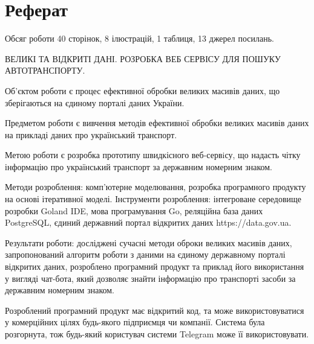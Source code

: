 \chapter*{Реферат}
Обсяг роботи 40 сторінок, 8 ілюстрацій, 1 таблиця, 13 джерел посилань.

ВЕЛИКІ ТА ВІДКРИТІ ДАНІ. РОЗРОБКА ВЕБ СЕРВІСУ ДЛЯ ПОШУКУ АВТОТРАНСПОРТУ.

Об'єктом роботи є процес ефективної обробки великих масивів даних,
що зберігаються на єдиному порталі даних України.

Предметом роботи є вивчення методів ефективної обробки
великих масивів даних на прикладі даних про український транспорт.

Метою роботи є розробка прототипу швидкісного веб-сервiсу,
що надасть чітку інформацію про український транспорт за
державним номерним знаком.

Методи розроблення: комп'ютерне моделювання, розробка програмного продукту на основі ітеративної
моделі.
Інструменти розроблення: інтегроване середовище розробки Goland IDE,
мова програмування Go, реляційна  база даних PostgreSQL, єдиний державний портал відкритих даних https://data.gov.ua.

Результати роботи: досліджені сучасні методи оброки великих масивів даних,
запропонований алгоритм роботи з даними на єдиному державному порталі відкритих даних,
розроблено програмний продукт та приклад його використання у вигляді чат-бота,
який дозволяє знайти інформацію про транспорті засоби за державним номерним знаком.

Розроблений програмний продукт має відкритий код,
та може використовуватися у комерційних цілях будь-якого підприємця чи компанії.
Система була розгорнута, тож будь-який користувач системи Telegram може її використовувати.
